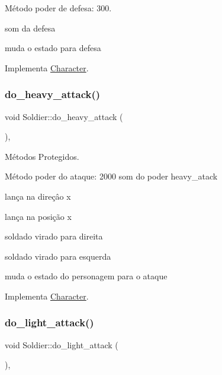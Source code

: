 Método poder de defesa\+: 300. 

som da defesa

muda o estado para defesa 

Implementa \mbox{\hyperlink{classCharacter_ad8a87c4397e38fd4bd88c93a3d3cb70a}{Character}}.

\mbox{\label{classSoldier_af06682afbd0dd5f560e31228688b21fe}} 
\subsubsection{\texorpdfstring{do\+\_\+heavy\+\_\+attack()}{do\_heavy\_attack()}}
{\footnotesize\ttfamily void Soldier\+::do\+\_\+heavy\+\_\+attack (\begin{DoxyParamCaption}{ }\end{DoxyParamCaption})\hspace{0.3cm}{\ttfamily [protected]}, {\ttfamily [virtual]}}



Métodos Protegidos. 

Método poder do ataque\+: 2000 som do poder heavy\+\_\+atack

lança na direçâo x

lança na posição x

soldado virado para direita

soldado virado para esquerda

muda o estado do personagem para o ataque 

Implementa \mbox{\hyperlink{classCharacter_aa9b20c9c53393c7aaf3a45e5c966c2ef}{Character}}.

\mbox{\label{classSoldier_ab0941d83546b933924b17b9aaa92818c}} 
\subsubsection{\texorpdfstring{do\+\_\+light\+\_\+attack()}{do\_light\_attack()}}
{\footnotesize\ttfamily void Soldier\+::do\+\_\+light\+\_\+attack (\begin{DoxyParamCaption}{ }\end{DoxyParamCaption})\hspace{0.3cm}{\ttfamily [protected]}, {\ttfamily [virtual]}}



